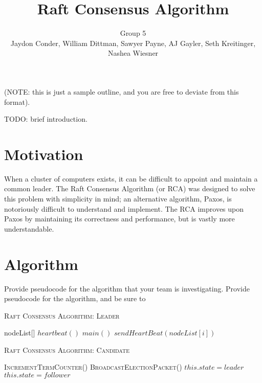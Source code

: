 \documentclass[11pt]{article}
\title{Raft Consensus Algorithm}
\author{Group 5 \\ 
\small{Jaydon Conder, William Dittman, Sawyer Payne, AJ Gayler, Seth Kreitinger, Nashea Wiesner}}
\begin{document}
\maketitle

(NOTE: this is just a sample outline, and you are free to deviate from this format).

TODO: brief introduction.

\section{Motivation}
When a cluster of computers exists, it can be difficult to appoint and maintain a common leader. The Raft Consensus Algorithm (or RCA) was designed to solve this problem with simplicity in mind; an alternative algorithm, Paxos, is notoriously difficult to understand and implement. The RCA improves upon Paxos by maintaining its correctness and performance, but is vastly more understandable. 

\section{Algorithm}
Provide pseudocode for the algorithm that your team is investigating.  Provide pseudocode for the algorithm, and be sure to 

\begin{algorithm}\caption{\textsc{Raft Consensus Algorithm: Leader}}
 \begin{algorithmic}[1]
    nodeList[] 
	\State $heartbeat ()$
	\State $main()$
  
   	\State $sendHeartBeat( nodeList[i])$  
   \EndFor	{}
   \EndFunction
   \EndFunction
 \end{algorithmic}
\end{algorithm}

\begin{algorithm}\caption{\textsc{Raft Consensus Algorithm: Candidate}}
 \begin{algorithmic}
 \textsc{IncrementTermCounter}() 
 \textsc{BroadcastElectionPacket()} 
 	\State $this.state = leader$ 
 \EndFunction\
 	\State $this.state = follower$ 
 \EndFunction
 \end{algorithmic}
\end{algorithm}
\end{document}
